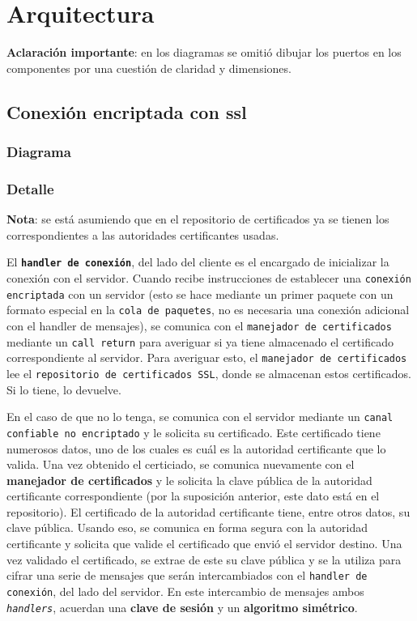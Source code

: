 \section{Arquitectura}
\textbf{Aclaración importante}: en los diagramas se omitió dibujar los puertos en los componentes por una cuestión de claridad y dimensiones.

\subsection{Conexión encriptada con ssl}
\subsubsection{Diagrama}


\subsubsection{Detalle}
\textbf{Nota}: se está asumiendo que en el repositorio de certificados ya se tienen los correspondientes a las autoridades certificantes usadas.

El \textbf{\texttt{handler de conexión}}, del lado del cliente es el encargado de inicializar la conexión con el servidor. Cuando recibe instrucciones de establecer una \texttt{conexión encriptada} con un servidor (esto se hace mediante un primer paquete con un formato especial en la \texttt{cola de paquetes}, no es necesaria una conexión adicional con el handler de mensajes), se comunica con el \texttt{manejador de certificados} mediante un \texttt{call return} para averiguar si ya tiene almacenado el certificado correspondiente al servidor. Para averiguar esto, el \texttt{manejador de certificados} lee el \texttt{repositorio de certificados SSL}, donde se almacenan estos certificados. Si lo tiene, lo devuelve.

En el caso de que no lo tenga, se comunica con el servidor mediante un \texttt{canal confiable no encriptado} y le solicita su certificado. Este certificado tiene numerosos datos, uno de los cuales es cuál es la autoridad certificante que lo valida. Una vez obtenido el certiciado, se comunica nuevamente con el \textbf{manejador de certificados} y le solicita la clave pública de la autoridad certificante correspondiente (por la suposición anterior, este dato está en el repositorio). El certificado de la autoridad certificante tiene, entre otros datos, su clave pública. Usando eso, se comunica en forma segura con la autoridad certificante y solicita que valide el certificado que envió el servidor destino. Una vez validado el certificado, se extrae de este su clave pública y se la utiliza para cifrar una serie de mensajes que serán intercambiados con el \texttt{handler de conexión}, del lado del servidor. En este intercambio de mensajes ambos \texttt{\emph{handlers}}, acuerdan una \textbf{clave de sesión} y un \textbf{algoritmo simétrico}.


